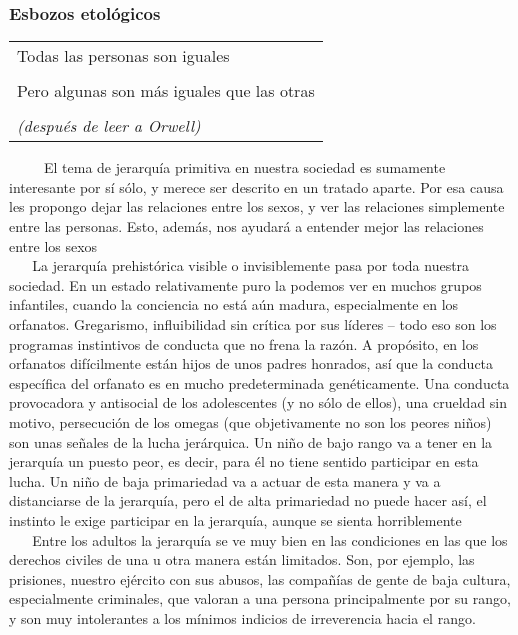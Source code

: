 \protect\hypertarget{M23}{}{}

\hypertarget{esbozos-etoluxf3gicos}{\subsubsection{Esbozos
etológicos}\label{esbozos-etoluxf3gicos}}

\begin{longtable}[]{@{}l@{}}
\toprule
Todas las personas son iguales\tabularnewline
\tabularnewline
Pero algunas son más iguales que las otras\tabularnewline
\tabularnewline
\emph{(después de leer a Orwell)}\tabularnewline
\bottomrule
\end{longtable}

~ ~ ~ El tema de jerarquía primitiva en nuestra sociedad es sumamente
interesante por sí sólo, y merece ser descrito en un tratado aparte. Por
esa causa les propongo dejar las relaciones entre los sexos, y ver las
relaciones simplemente entre las personas. Esto, además, nos ayudará a
entender mejor las relaciones entre los sexos\\
\hspace*{0.333em} ~ ~ La jerarquía prehistórica visible o invisiblemente
pasa por toda nuestra sociedad. En un estado relativamente puro la
podemos ver en muchos grupos infantiles, cuando la conciencia no está
aún madura, especialmente en los orfanatos. Gregarismo, influibilidad
sin crítica por sus líderes -- todo eso son los programas instintivos de
conducta que no frena la razón. A propósito, en los orfanatos
difícilmente están hijos de unos padres honrados, así que la conducta
específica del orfanato es en mucho predeterminada genéticamente. Una
conducta provocadora y antisocial de los adolescentes (y no sólo de
ellos), una crueldad sin motivo, persecución de los omegas (que
objetivamente no son los peores niños) son unas señales de la lucha
jerárquica. Un niño de bajo rango va a tener en la jerarquía un puesto
peor, es decir, para él no tiene sentido participar en esta lucha. Un
niño de baja primariedad va a actuar de esta manera y va a distanciarse
de la jerarquía, pero el de alta primariedad no puede hacer así, el
instinto le exige participar en la jerarquía, aunque se sienta
horriblemente\\
\hspace*{0.333em} ~ ~ Entre los adultos la jerarquía se ve muy bien en
las condiciones en las que los derechos civiles de una u otra manera
están limitados. Son, por ejemplo, las prisiones, nuestro ejército con
sus abusos, las compañías de gente de baja cultura, especialmente
criminales, que valoran a una persona principalmente por su rango, y son
muy intolerantes a los mínimos indicios de irreverencia hacia el rango.

